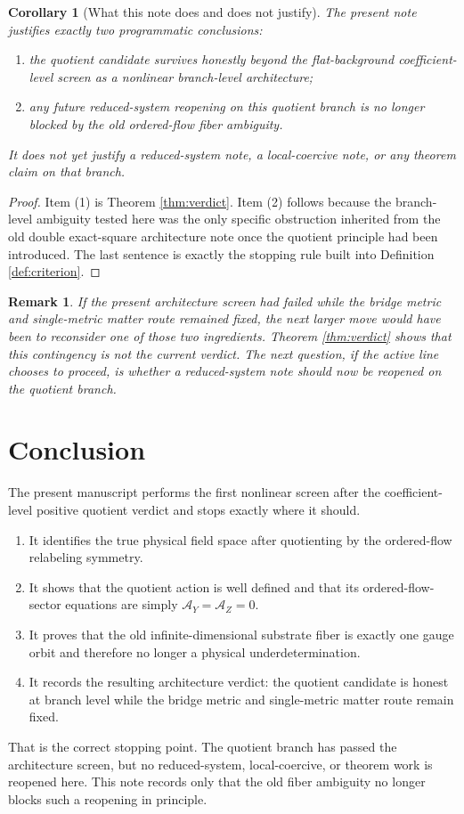\documentclass[11pt]{article}
\newcommand{\AY}{\mathcal A_Y}
\newcommand{\AZ}{\mathcal A_Z}
\newtheorem{remark}{Remark}
\newtheorem{corollary}{Corollary}
\begin{document}
\begin{corollary}[What this note does and does not justify]
\label{cor:stop}
The present note justifies exactly two programmatic conclusions:
\begin{enumerate}
    \item the quotient candidate survives honestly beyond the flat-background coefficient-level screen as a nonlinear branch-level architecture;
    \item any future reduced-system reopening on this quotient branch is no longer blocked by the old ordered-flow fiber ambiguity.
\end{enumerate}
It does \emph{not} yet justify a reduced-system note, a local-coercive note, or any theorem claim on that branch.
\end{corollary}

\begin{proof}
Item (1) is Theorem \ref{thm:verdict}. Item (2) follows because the branch-level ambiguity tested here was the only specific obstruction inherited from the old double exact-square architecture note once the quotient principle had been introduced. The last sentence is exactly the stopping rule built into Definition \ref{def:criterion}.
\end{proof}

\begin{remark}
If the present architecture screen had failed while the bridge metric and single-metric matter route remained fixed, the next larger move would have been to reconsider one of those two ingredients. Theorem \ref{thm:verdict} shows that this contingency is not the current verdict. The next question, if the active line chooses to proceed, is whether a reduced-system note should now be reopened on the quotient branch.
\end{remark}

\section{Conclusion}

The present manuscript performs the first nonlinear screen after the coefficient-level positive quotient verdict and stops exactly where it should.
\begin{enumerate}
    \item It identifies the true physical field space after quotienting by the ordered-flow relabeling symmetry.
    \item It shows that the quotient action is well defined and that its ordered-flow-sector equations are simply \(\AY=\AZ=0\).
    \item It proves that the old infinite-dimensional substrate fiber is exactly one gauge orbit and therefore no longer a physical underdetermination.
    \item It records the resulting architecture verdict: the quotient candidate is honest at branch level while the bridge metric and single-metric matter route remain fixed.
\end{enumerate}

That is the correct stopping point. The quotient branch has passed the architecture screen, but no reduced-system, local-coercive, or theorem work is reopened here. This note records only that the old fiber ambiguity no longer blocks such a reopening in principle.
\end{document}
